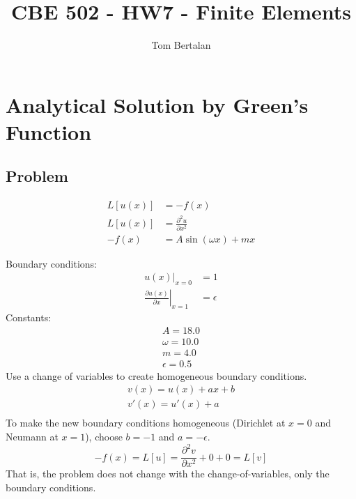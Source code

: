 \documentclass[10pt]{article}
\title{CBE 502 - HW7 - Finite Elements}
\author{Tom Bertalan}
\begin{document}
\maketitle

\tableofcontents

\listoffigures

\section{Analytical Solution by Green's Function}
\label{sec:green}

\subsection{Problem}

\begin{equation}
    \label{eqn:problem}
    \begin{split}
        L[u(x)] &= -f(x) \\
        L[u(x)] &=  \frac{\partial^2 u}{\partial x^2} \\
        -f(x) &= A \sin (\omega x) + m x
    \end{split}
\end{equation}

Boundary conditions:
\begin{equation}
    \begin{split}
        \left. u(x) \right| _{x=0} &= 1 \\
        \left. \frac{\partial u(x)}{\partial x}\right|_{x=1} &= \epsilon
    \end{split}
\end{equation}
Constants:
\begin{equation}
    \label{eqn:constants}
    \begin{split}
        A = 18.0 \\
        \omega = 10.0 \\
        m = 4.0 \\
        \epsilon = 0.5
    \end{split}
\end{equation}
Use a change of variables to create homogeneous boundary conditions.
\begin{equation}
    \label{eqn:changeofvars}
    \begin{split}
        v(x) = u(x) + a x + b \\
        v'(x) = u'(x) + a \\
    \end{split}
\end{equation}
To make the new boundary conditions homogeneous (Dirichlet at $x=0$ and Neumann at $x=1$), choose $b=-1$ and $a=-\epsilon$.
$$
    -f(x) = L[u] = \frac{\partial^2 v}{\partial x^2} + 0 + 0 = L[v]
$$
That is, the problem does not change with the change-of-variables, only the boundary conditions.
\end{document}
